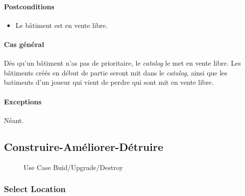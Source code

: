 \documentclass[a4paper,11pt]{report}
\begin{document}
\paragraph{Postconditions}
\begin{itemize}
 \item Le bâtiment est en vente libre.
\end{itemize}
\paragraph{Cas général}
Dès qu'un bâtiment n'as pas de prioritaire, le \textit{catalog} le met en vente libre. Les bâtiments créés en début de partie seront mit dans le \textit{catalog}, ainsi que les batiments d'un joueur qui vient de perdre qui sont mit en vente libre.
\paragraph{Exceptions} Néant.

\newpage
\subsection{Construire-Améliorer-Détruire}
\begin{figure}[ht]
    \caption{Use Case Buid/Upgrade/Destroy}
\end{figure}

\subsubsection{Select Location}
\end{document}
